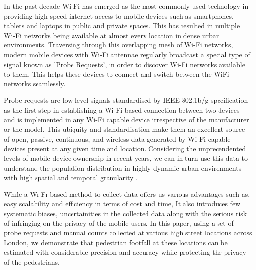 In the past decade Wi-Fi has emerged as the most commonly used technology in providing high speed internet access to mobile devices such as smartphones, tablets and laptops in public and private spaces. This has resulted in multiple Wi-Fi networks being available at almost every location in dense urban environments. Traversing through this overlapping mesh of Wi-Fi networks, modern mobile devices with Wi-Fi antennae regularly broadcast a special type of signal known as 'Probe Requests', in order to discover Wi-Fi networks available to them. This helps these devices to connect and switch between the WiFi networks seamlessly.

Probe requests are low level signals standardised by IEEE 802.1b/g specification as the first step in establishing a Wi-Fi based connection between two devices and is implemented in any Wi-Fi capable device irrespective of the manufacturer or the model. This ubiquity and standardisation make them an excellent source of open, passive, continuous, and wireless data generated by Wi-Fi capable devices present at any given time and location. Considering the unprecendented levels of mobile device ownership in recent years, we can in turn use this data to understand the population distribution in highly dynamic urban environments with high spatial and temporal granularity \citep{freud2015,konto2017}.

While a Wi-Fi based method to collect data offers us various advantages such as, easy scalability and efficiency in terms of cost and time, It also introduces few systematic biases, uncertainities in the collected data along with the serious risk of infringing on the privacy of the mobile users. In this paper, using a set of probe requests and manual counts collected at various high street locations across London, we demonstrate that pedestrian footfall at these locations can be estimated with considerable precision and accuracy while protecting the privacy of the pedestrians.
